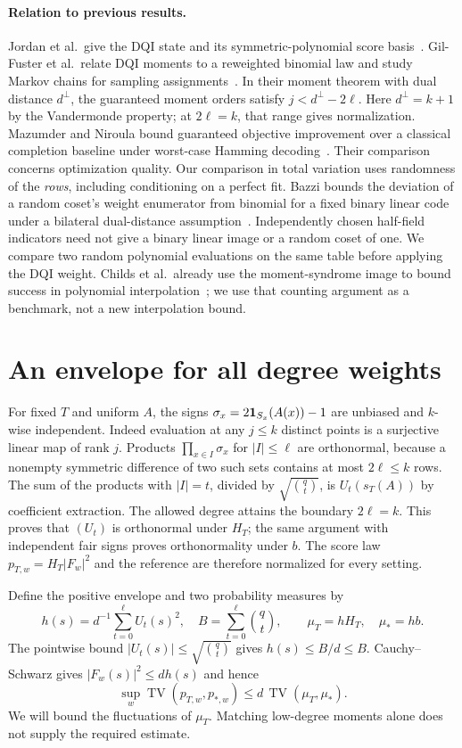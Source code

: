 \documentclass[11pt]{article}
\newcommand{\TV}{\operatorname{TV}}
\begin{document}
\paragraph{Relation to previous results.}
Jordan et al.\ give the DQI state and its symmetric-polynomial score basis~\cite{jordan}. Gil-Fuster et al.\ relate DQI moments to a reweighted binomial law and study Markov chains for sampling assignments~\cite{gil}. In their moment theorem with dual distance $d^\perp$, the guaranteed moment orders satisfy $j<d^\perp-2\ell$. Here $d^\perp=k+1$ by the Vandermonde property; at $2\ell=k$, that range gives normalization. Mazumder and Niroula bound guaranteed objective improvement over a classical completion baseline under worst-case Hamming decoding~\cite{mazumder}. Their comparison concerns optimization quality. Our comparison in total variation uses randomness of the \emph{rows}, including conditioning on a perfect fit. Bazzi bounds the deviation of a random coset's weight enumerator from binomial for a fixed binary linear code under a bilateral dual-distance assumption~\cite{bazzi}. Independently chosen half-field indicators need not give a binary linear image or a random coset of one. We compare two random polynomial evaluations on the same table before applying the DQI weight. Childs et al.\ already use the moment-syndrome image to bound success in polynomial interpolation~\cite{childs}; we use that counting argument as a benchmark, not a new interpolation bound.

\section{An envelope for all degree weights}
For fixed $T$ and uniform $A$, the signs $\sigma_x=2{\bf1}_{S_x}(A(x))-1$ are unbiased and $k$-wise independent. Indeed evaluation at any $j\le k$ distinct points is a surjective linear map of rank $j$. Products $\prod_{x\in I}\sigma_x$ for $|I|\le\ell$ are orthonormal, because a nonempty symmetric difference of two such sets contains at most $2\ell\le k$ rows. The sum of the products with $|I|=t$, divided by $\sqrt{\binom qt}$, is $U_t(s_T(A))$ by coefficient extraction. The allowed degree attains the boundary $2\ell=k$. This proves that $(U_t)$ is orthonormal under $H_T$; the same argument with independent fair signs proves orthonormality under $b$. The score law $p_{T,w}=H_T |F_w|^2$ and the reference are therefore normalized for every setting.

Define the positive envelope and two probability measures by
\[
 h(s)=d^{-1}\sum_{t=0}^{\ell}U_t(s)^2,\quad
 B=\sum_{t=0}^{\ell}\binom qt,\qquad \mu_T=hH_T,\quad \mu_*=hb.
\]
The pointwise bound $|U_t(s)|\le\sqrt{\binom qt}$ gives $h(s)\le B/d\le B$. Cauchy--Schwarz gives $|F_w(s)|^2\le d h(s)$ and hence
\begin{equation}\label{eq:env}
 \sup_w\TV(p_{T,w},p_{*,w})\le d\,\TV(\mu_T,\mu_*).
\end{equation}
We will bound the fluctuations of $\mu_T$. Matching low-degree moments alone does not supply the required estimate.
\end{document}
